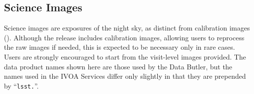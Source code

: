 


%

% 

% 



\subsection{Science Images
\label{ssec:science_images}}
Science images are exposures of the night sky, as distinct from calibration images (). 
Although the release includes calibration images, allowing users to reprocess the raw images if needed, this is expected to be necessary only in rare cases. 
Users are strongly encouraged to start from the visit-level images provided.
The data product names shown here are those used by the Data Butler, but the names used in the IVOA Services differ only slightly in that they are prepended by ``\texttt{lsst.}''.

 
